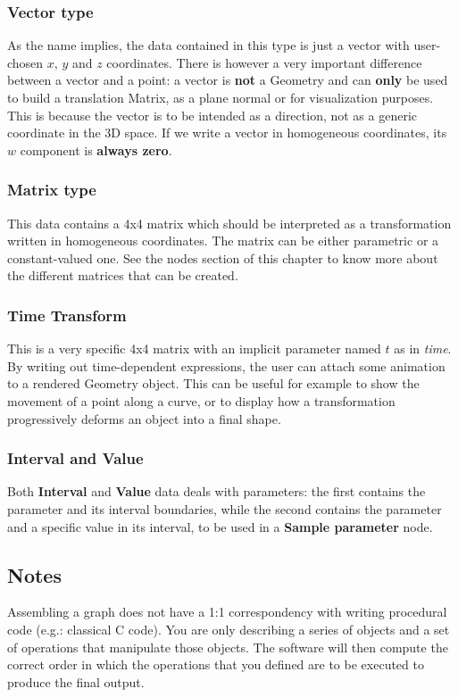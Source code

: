 \subsubsection{Vector type}
As the name implies, the data contained in this type is just a vector with
user-chosen $x$, $y$ and $z$ coordinates. There is however a very important
difference between a vector and a point: a vector is \textbf{not} a Geometry and
can \textbf{only} be used to build a translation Matrix, as a plane normal or for
visualization purposes. This is because the vector is to be intended as a direction,
not as a generic coordinate in the 3D space. If we write a vector
in homogeneous coordinates, its $w$ component is \textbf{always zero}.

\subsubsection{Matrix type}
This data contains a 4x4 matrix which should be interpreted as a transformation written in
homogeneous coordinates. The matrix can be either parametric or a constant-valued one.
See the nodes section of this chapter to know more about the different matrices that can
be created.

\subsubsection{Time Transform}
This is a very specific 4x4 matrix with an implicit parameter named $t$ as in \textit{time}.
By writing out time-dependent expressions, the user can attach some animation to 
a rendered Geometry object. This can be useful for example to show the movement of a
point along a curve, or to display how a transformation progressively deforms an object
into a final shape.

\subsubsection{Interval and Value}
Both \textbf{Interval} and \textbf{Value} data deals with parameters: the first contains
the parameter and its interval boundaries, while the second contains the parameter and
a specific value in its interval, to be used in a \textbf{Sample parameter} node.

\subsection{Notes}
Assembling a graph does not have a 1:1 correspondency with writing procedural
code (e.g.: classical C code). You are only describing a series of
objects and a set of operations that manipulate those objects. The software
will then compute the correct order in which the operations that you defined
are to be executed to produce the final output.

